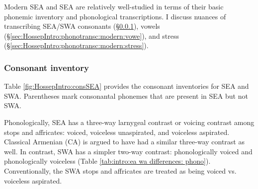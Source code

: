 Modern SEA and SEA are relatively well-studied in terms of their basic phonemic inventory and phonological transcriptions. I discuss nuances of transcribing SEA/SWA consonants (\S\ref{sec:HossepIntro:phonotransc:modern:cons}), vowels (\S\ref{sec:HossepIntro:phonotransc:modern:vowe}),  and stress (\S\ref{sec:HossepIntro:phonotransc:modern:stress}). 
\subsubsection{Consonant inventory}\label{sec:HossepIntro:phonotransc:modern:cons}
Table \ref{fig:HossepIntro:consSEA} provides the consonant inventories for SEA and SWA. Parentheses mark consonantal phonemes that are present in SEA but not SWA. 

\begin{table}[H]
	\caption{Consonant inventory of SEA and SWA}\label{fig:HossepIntro:consSEA}
\end{table}

Phonologically, SEA has a three-way larnygeal contrast or voicing contrast among stops and affricates: voiced, voiceless unaspirated, and voiceless aspirated. Classical Armenian (CA) is argued to have had a similar three-way contrast as well. In contrast, SWA has a simpler two-way contrast: phonologically voiced and phonologically voiceless (Table \ref{tab:intro:ea wa differences: phono}). Conventionally, the SWA stops and affricates are treated as being voiced vs. voiceless aspirated.

